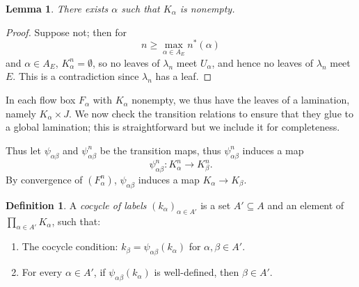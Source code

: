 \documentclass[reqno,11pt]{amsart}
\newcommand{\dfn}[1]{\emph{#1}\index{#1}}
\newtheorem{lemma}[theorem]{Lemma}
\theoremstyle{definition}
\newtheorem{definition}[theorem]{Definition}
\numberwithin{equation}{section}
\begin{document}
\begin{lemma}\label{label sets are nonempty}
	There exists $\alpha$ such that $K_\alpha$ is nonempty.
\end{lemma}
\begin{proof}
	Suppose not; then for
	$$n \geq \max_{\alpha \in A_E} n^*(\alpha)$$
	and $\alpha \in A_E$, $K_\alpha^n = \emptyset$, so no leaves of $\lambda_n$ meet $U_\alpha$, and hence no leaves of $\lambda_n$ meet $E$.
	This is a contradiction since $\lambda_n$ has a leaf.
\end{proof}

In each flow box $F_\alpha$ with $K_\alpha$ nonempty, we thus have the leaves of a lamination, namely $K_\alpha \times J$.
We now check the transition relations to ensure that they glue to a global lamination; this is straightforward but we include it for completeness.

Thus let $\psi_{\alpha \beta}$ and $\psi_{\alpha \beta}^n$ be the transition maps, thus $\psi_{\alpha \beta}^n$ induces a map
$$\psi_{\alpha \beta}^n: K_\alpha^n \to K_\beta^n.$$
By convergence of $(F_\alpha^n)$, $\psi_{\alpha \beta}$ induces a map $K_\alpha \to K_\beta$.

\begin{definition}
	A \dfn{cocycle of labels} $(k_\alpha)_{\alpha \in A'}$ is a set $A' \subseteq A$ and an element of $\prod_{\alpha \in A'} K_\alpha$, such that:
\begin{enumerate}
	\item The cocycle condition: $k_\beta = \psi_{\alpha \beta}(k_\alpha)$ for $\alpha, \beta \in A'$.
	\item For every $\alpha \in A'$, if $\psi_{\alpha \beta}(k_\alpha)$ is well-defined, then $\beta \in A'$.
\end{enumerate}
\end{definition}
\end{document}
